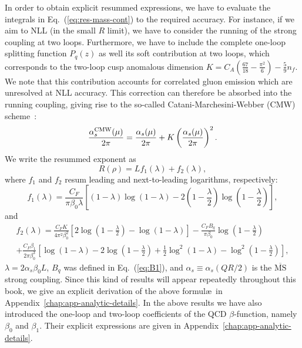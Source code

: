 In order to obtain explicit resummed expressions, we have to evaluate
the integrals in Eq.~(\ref{eq:res-mass-cont}) to the required
accuracy. For instance, if we aim to NLL (in the small $R$ limit), we
have to consider the running of the strong coupling at two
loops. Furthermore, we have to include the complete one-loop splitting
function $P_q(z)$ as well its soft contribution at two loops, which
corresponds to the two-loop cusp anomalous dimension
$K=C_A \left (\frac{67}{18}- \frac{\pi^2}{6} \right ) - \frac{5}{9}
n_f$. We note that this contribution accounts for correlated gluon
emission which are unresolved at NLL accuracy. This correction can
therefore be absorbed into the running coupling, giving rise to the
so-called Catani-Marchesini-Webber (CMW) scheme~\cite{Catani:1990rr}:
\begin{equation}\label{eq:CMW} 
\frac{\alpha_s^\text{CMW}(\mu)}{2\pi }=\frac{\alpha_s(\mu)}{2 \pi}+ K \left(\frac{\alpha_s(\mu)}{2 \pi}\right)^2.
\end{equation}
%    
We write the resummed exponent as
\begin{equation}\label{eq:radiator-nll-expansion}
R (\rho)= Lf_1(\lambda)+ f_2(\lambda),
\end{equation}
where $f_1$ and $f_2$ resum leading and next-to-leading logarithms,
respectively:
\begin{equation}
\label{eq:quark}
f_1(\lambda) =  \frac{C_F}{\pi \beta_0 \lambda} \left [ \left(1-\lambda \right ) 
\log \left(1-\lambda \right)-2 \left ( 1-\frac{\lambda}{2} \right ) \log \left
  (1-\frac{\lambda}{2} \right ) \right ],
\end{equation}
and
\begin{multline} \label{eq:radiator-nll-contribution}
f_2(\lambda) =  \frac{C_F K}{4 \pi^2 \beta_0^2} \left [2 \log \left 
(1-\frac{\lambda}{2} \right ) - \log \left (1-\lambda \right )\right ] -
\frac{ C_F B_q}{\pi \beta_0} \log \left ( 1-\frac{\lambda}{2} \right ) 
\\  +\frac{C_F \beta_1}{2 \pi \beta_0^3} \left [ \log \left (1-\lambda \right )-2 \log 
\left (1-\frac{\lambda}{2} \right ) + \frac{1}{2} \log^2 \left (1- \lambda \right ) 
- \log^2 \left (1-\frac{\lambda}{2} \right ) \right ],
\end{multline}
$\lambda = 2 \alpha_s\beta_0 L$, $B_q$ was defined in
Eq.~(\ref{eq:B1}), and $\alpha_s\equiv\alpha_s\left(QR/2\right)$ is
the $\overline{\text{MS}}$ strong coupling.
% 
Since this kind of results will appear repeatedly throughout this
book, we give an explicit derivation of the above formul\ae\ in
Appendix~\ref{chap:app-analytic-details}. In the above results we have also
introduced the one-loop and two-loop coefficients of the QCD $\beta$-function, namely $\beta_0$ and $\beta_1$. 
Their explicit expressions are given in Appendix~\ref{chap:app-analytic-details}.

